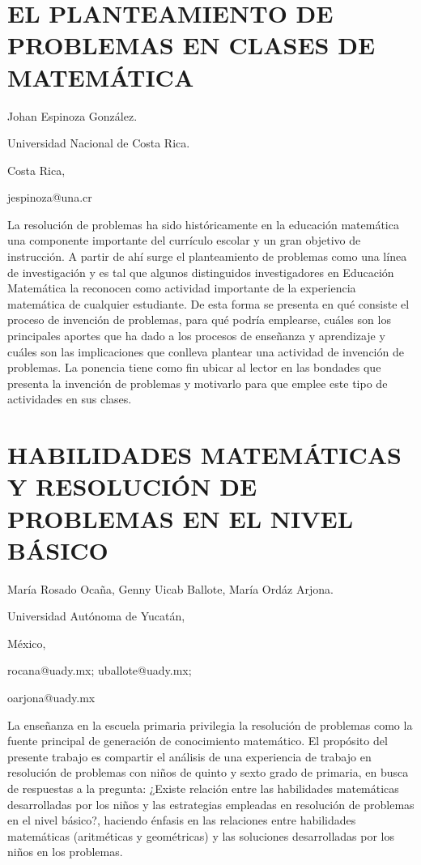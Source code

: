 \section{EL PLANTEAMIENTO DE PROBLEMAS EN CLASES DE MATEMÁTICA}

\begin{datos}

Johan Espinoza González. 

Universidad Nacional de Costa Rica.

Costa Rica,

jespinoza@una.cr 

\end{datos}

La resolución de problemas ha sido históricamente en la educación
matemática una componente importante del currículo escolar y un gran
objetivo de instrucción. A partir de ahí surge el planteamiento de
problemas como una línea de investigación y es tal que algunos distinguidos
investigadores en Educación Matemática la reconocen como actividad
importante de la experiencia matemática de cualquier estudiante. De
esta forma se presenta en qué consiste el proceso de invención de
problemas, para qué podría emplearse, cuáles son los principales aportes
que ha dado a los procesos de enseñanza y aprendizaje y cuáles son
las implicaciones que conlleva plantear una actividad de invención
de problemas. La ponencia tiene como fin ubicar al lector en las bondades
que presenta la invención de problemas y motivarlo para que emplee
este tipo de actividades en sus clases.


\section{HABILIDADES MATEMÁTICAS Y RESOLUCIÓN DE PROBLEMAS EN EL NIVEL BÁSICO}

\begin{datos}

María Rosado Ocaña, Genny Uicab Ballote, María Ordáz Arjona.

Universidad Autónoma de Yucatán,

México,

rocana@uady.mx; uballote@uady.mx;

oarjona@uady.mx 

\end{datos}

La enseñanza en la escuela primaria privilegia la resolución de problemas
como la fuente principal de generación de conocimiento matemático.
El propósito del presente trabajo es compartir el análisis de una
experiencia de trabajo en resolución de problemas con niños de quinto
y sexto grado de primaria, en busca de respuestas a la pregunta: ¿Existe
relación entre las habilidades matemáticas desarrolladas por los niños
y las estrategias empleadas en resolución de problemas en el nivel
básico?, haciendo énfasis en las relaciones entre habilidades matemáticas
(aritméticas y geométricas) y las soluciones desarrolladas por los
niños en los problemas.


